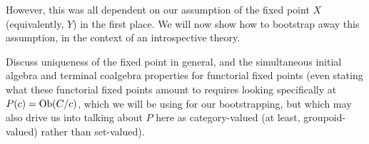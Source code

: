 However, this was all dependent on our assumption of the fixed point $X$ (equivalently, $Y$) in the first place. We will now show how to bootstrap away this assumption, in the context of an introspective theory. 

\begin{TODOblock}
Discuss uniqueness of the fixed point in general, and the simultaneous initial algebra and terminal coalgebra properties for functorial fixed points (even stating what these functorial fixed points amount to requires looking specifically at $P(c) = \operatorname{Ob}(C/c)$, which we will be using for our bootstrapping, but which may also drive us into talking about $P$ here as category-valued (at least, groupoid-valued) rather than set-valued).
\end{TODOblock}